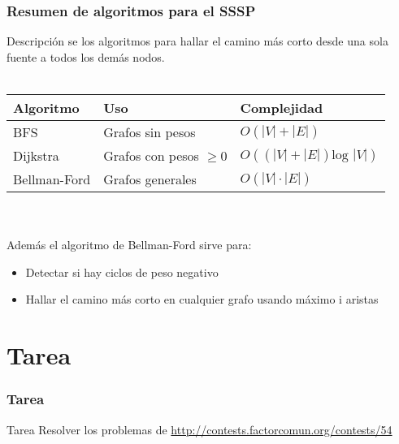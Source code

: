 \documentclass{beamer}
\begin{document}
	\begin{frame}
		\frametitle{Resumen de algoritmos para el SSSP}
		Descripción se los algoritmos para hallar el camino más corto desde una sola fuente a todos los demás nodos. \\ \quad \\
		\begin{tabular}{|l|l|l|}
			\hline
			\textbf{Algoritmo}  & \textbf{Uso}                & \textbf{Complejidad}\\
			\hline                                           
			BFS                 & Grafos sin pesos            & $O(|V| + |E|)$\\
			\hline                                            
			Dijkstra            & Grafos con pesos $\geq 0$   & $O((|V| + |E|) \text{log }|V|)$\\
			\hline                                            
			Bellman-Ford        & Grafos generales            & $O(|V|\cdot |E|)$\\
			\hline
		\end{tabular}
		\\ \quad \\
		Además el algoritmo de Bellman-Ford sirve para:
		\begin{itemize}
			\item Detectar si hay ciclos de peso negativo
			\item Hallar el camino más corto en cualquier grafo usando máximo i aristas
		\end{itemize}
	\end{frame}

\section{Tarea}
	\begin{frame}[fragile]
		\frametitle{Tarea}
		\begin{alertblock}{Tarea}
			Resolver los problemas de \url{http://contests.factorcomun.org/contests/54}
		\end{alertblock}
	\end{frame}
\end{document}
